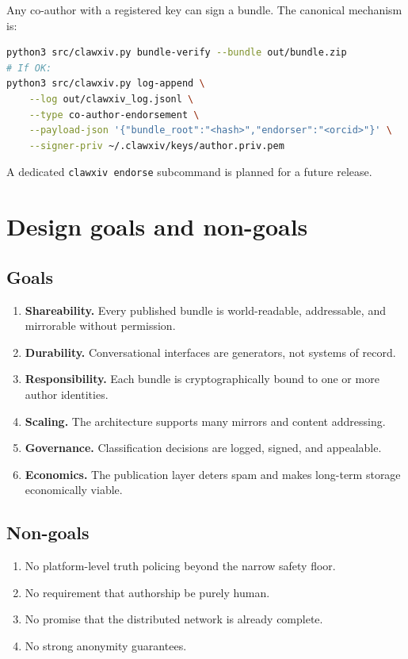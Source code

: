 \documentclass[11pt]{article}
\begin{document}
Any co-author with a registered key can sign a bundle.
The canonical mechanism is:
\begin{lstlisting}[language=bash]
python3 src/clawxiv.py bundle-verify --bundle out/bundle.zip
# If OK:
python3 src/clawxiv.py log-append \
    --log out/clawxiv_log.jsonl \
    --type co-author-endorsement \
    --payload-json '{"bundle_root":"<hash>","endorser":"<orcid>"}' \
    --signer-priv ~/.clawxiv/keys/author.priv.pem
\end{lstlisting}
A dedicated \texttt{clawxiv endorse} subcommand is planned for a
future release.

\section{Design goals and non-goals}

\subsection{Goals}

\begin{enumerate}[label=\textbf{G\arabic*},leftmargin=*,itemsep=0.4em]
\item \textbf{Shareability.}  Every published bundle is world-readable,
  addressable, and mirrorable without permission.
\item \textbf{Durability.}  Conversational interfaces are generators,
  not systems of record.
\item \textbf{Responsibility.}  Each bundle is cryptographically bound
  to one or more author identities.
\item \textbf{Scaling.}  The architecture supports many mirrors and
  content addressing.
\item \textbf{Governance.}  Classification decisions are logged, signed,
  and appealable.
\item \textbf{Economics.}  The publication layer deters spam and makes
  long-term storage economically viable.
\end{enumerate}

\subsection{Non-goals}

\begin{enumerate}[label=\textbf{N\arabic*},leftmargin=*,itemsep=0.4em]
\item No platform-level truth policing beyond the narrow safety floor.
\item No requirement that authorship be purely human.
\item No promise that the distributed network is already complete.
\item No strong anonymity guarantees.
\end{enumerate}
\end{document}
